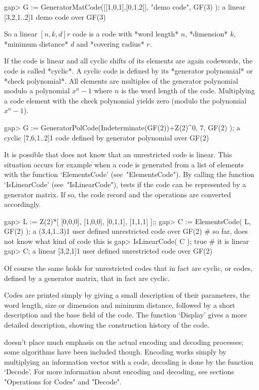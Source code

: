 \beginexample
gap> G := GeneratorMatCode([[1,0,1],[0,1,2]], "demo code", GF(3) );
a linear [3,2,1..2]1 demo code over GF(3) 
\endexample

So   a  linear $[n,  k, d]r$  code is  a   code  with  *word length* $n$,
*dimension* $k$, *minimum distance* $d$ and *covering radius* $r$.

If the code is linear  and all cyclic shifts   of its elements are  again
codewords, the code is called *cyclic*.  A cyclic code  is defined by its
*generator polynomial* or  *check polynomial*. All elements are multiples
of the generator polynomial modulo a polynomial $x^n -1$ where $n$ is the
word  length of  the  code. Multiplying  a   code element with  the check
polynomial yields zero (modulo the polynomial $x^n -1$).

\beginexample
gap> G := GeneratorPolCode(Indeterminate(GF(2))+Z(2)^0, 7, GF(2) );
a cyclic [7,6,1..2]1 code defined by generator polynomial over GF(2)
\endexample

It is possible that {\GUAVA} does not know that an unrestricted  code  is
linear. This situation occurs for example when a code is generated from a
list of elements with the function  `ElementsCode'  (see~"ElementsCode").
By calling the  function  `IsLinearCode'  (see~"IsLinearCode"),  {\GUAVA}
tests if the code can be represented by a generator matrix.  If  so,  the
code record and the operations are converted accordingly.

\beginexample
gap> L := Z(2)*[ [0,0,0], [1,0,0], [0,1,1], [1,1,1] ];;
gap> C := ElementsCode( L, GF(2) );
a (3,4,1..3)1 user defined unrestricted code over GF(2)
# so far, {\GUAVA} does not know what kind of code this is
gap> IsLinearCode( C );
true                      # it is linear
gap> C;
a linear [3,2,1]1 user defined unrestricted code over GF(2) 
\endexample

Of course the same holds for unrestricted codes that  in fact are cyclic,
or codes, defined by a generator matrix, that in fact are cyclic.

Codes   are  printed simply  by  giving  a   small  description of  their
parameters,  the word  length, size  or  dimension and minimum  distance,
followed by a short description  and  the base field  of  the code.   The
function `Display'  gives a    more  detailed description,   showing  the
construction history of the code.

{\GUAVA} doesn't place much emphasis on the actual encoding and  decoding
processes; some algorithms have  been  included  though.  Encoding  works
simply by multiplying an information vector with a code, decoding is done
by the  function  `Decode'.  For  more  information  about  encoding  and
decoding, see sections "Operations for Codes" and "Decode".

